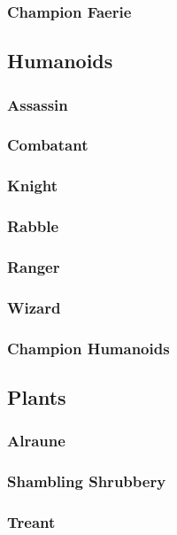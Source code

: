 \subsubsection{Champion Faerie}

\subsection{Humanoids}
\begin{multicols}{2}
    \subsubsection*{Assassin}\label{foe:assassin}
    \subsubsection*{Combatant}\label{foe:combatant}
    \subsubsection*{Knight}\label{foe:knight}
    \subsubsection*{Rabble}\label{foe:rabble}
    \subsubsection*{Ranger}\label{foe:ranger}
    \subsubsection*{Wizard}\label{foe:wizard}
\end{multicols}
\subsubsection{Champion Humanoids}

\subsection{Plants}
\begin{multicols}{2}
    \subsubsection*{Alraune}\label{foe:alraune}
    \subsubsection*{Shambling Shrubbery}\label{foe:shambling}
    \subsubsection*{Treant}\label{foe:treant}
\end{multicols}
